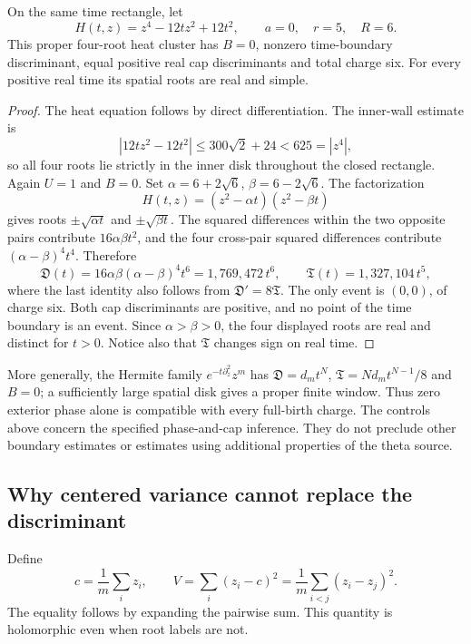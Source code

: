 \begin{proposition}
\label{m:quarticcontrol}
On the same time rectangle, let
\[
 H(t,z)=z^4-12tz^2+12t^2,
 \qquad a=0,\quad r=5,\quad R=6.
\]
This proper four-root heat cluster has $B=0$, nonzero
time-boundary discriminant, equal positive real cap discriminants and
total charge six.  For every positive real time its spatial roots are
real and simple.
\end{proposition}
\begin{proof}
The heat equation follows by direct differentiation.  The inner-wall
estimate is
\[
 |12tz^2-12t^2|\leq300\sqrt2+24<625=|z^4|,
\]
so all four roots lie strictly in the inner disk throughout the
closed rectangle.  Again $U=1$ and $B=0$.  Set
$\alpha=6+2\sqrt6$, $\beta=6-2\sqrt6$.  The factorization
\[
 H(t,z)=(z^2-\alpha t)(z^2-\beta t)
\]
gives roots $\pm\sqrt{\alpha t}$ and $\pm\sqrt{\beta t}$.
The squared differences within the two opposite pairs contribute
$16\alpha\beta t^2$, and the four cross-pair squared differences
contribute $(\alpha-\beta)^4t^4$.  Therefore
\[
 \mathfrak D(t)=16\alpha\beta(\alpha-\beta)^4t^6
              =1{,}769{,}472\,t^6,
 \qquad
 \mathfrak T(t)=1{,}327{,}104\,t^5,
\]
where the last identity also follows from $\mathfrak D'=8\mathfrak T$.
The only event is $(0,0)$, of charge six.  Both cap discriminants are
positive, and no point of the time boundary is an event.  Since
$\alpha>\beta>0$, the four displayed roots are real and distinct for
$t>0$.  Notice also that $\mathfrak T$ changes sign on real time.
\end{proof}

More generally, the Hermite family $e^{-t\partial_z^2}z^m$ has
$\mathfrak D=d_mt^N$, $\mathfrak T=Nd_mt^{N-1}/8$ and
$B=0$; a sufficiently large spatial disk gives a proper
finite window.  Thus zero exterior phase alone is compatible with
every full-birth charge.  The controls above concern the specified
phase-and-cap inference.  They do not preclude other boundary
estimates or estimates using additional properties of the theta
source.

\subsection{Why centered variance cannot replace the discriminant}

Define
\[
 c=\frac1m\sum_i z_i,\qquad
 V=\sum_i(z_i-c)^2=\frac1m\sum_{i<j}(z_i-z_j)^2.
\]
The equality follows by expanding the pairwise sum.  This quantity is
holomorphic even when root labels are not.

